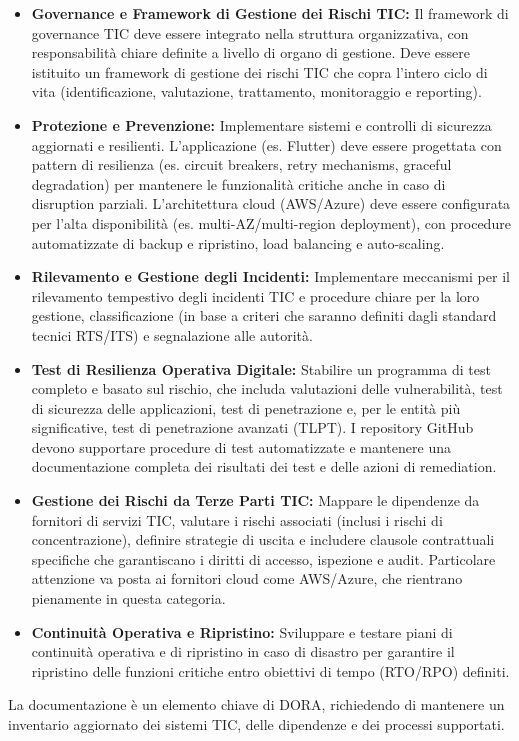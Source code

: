 \begin{itemize}
    \item \textbf{Governance e Framework di Gestione dei Rischi TIC:} Il framework di governance TIC deve essere integrato nella struttura organizzativa, con responsabilità chiare definite a livello di organo di gestione. Deve essere istituito un framework di gestione dei rischi TIC che copra l'intero ciclo di vita (identificazione, valutazione, trattamento, monitoraggio e reporting).
    \item \textbf{Protezione e Prevenzione:} Implementare sistemi e controlli di sicurezza aggiornati e resilienti. L'applicazione (es. Flutter) deve essere progettata con pattern di resilienza (es. circuit breakers, retry mechanisms, graceful degradation) per mantenere le funzionalità critiche anche in caso di disruption parziali. L'architettura cloud (AWS/Azure) deve essere configurata per l'alta disponibilità (es. multi-AZ/multi-region deployment), con procedure automatizzate di backup e ripristino, load balancing e auto-scaling.
    \item \textbf{Rilevamento e Gestione degli Incidenti:} Implementare meccanismi per il rilevamento tempestivo degli incidenti TIC e procedure chiare per la loro gestione, classificazione (in base a criteri che saranno definiti dagli standard tecnici RTS/ITS) e segnalazione alle autorità.
    \item \textbf{Test di Resilienza Operativa Digitale:} Stabilire un programma di test completo e basato sul rischio, che includa valutazioni delle vulnerabilità, test di sicurezza delle applicazioni, test di penetrazione e, per le entità più significative, test di penetrazione avanzati (TLPT). I repository GitHub devono supportare procedure di test automatizzate e mantenere una documentazione completa dei risultati dei test e delle azioni di remediation.
    \item \textbf{Gestione dei Rischi da Terze Parti TIC:} Mappare le dipendenze da fornitori di servizi TIC, valutare i rischi associati (inclusi i rischi di concentrazione), definire strategie di uscita e includere clausole contrattuali specifiche che garantiscano i diritti di accesso, ispezione e audit. Particolare attenzione va posta ai fornitori cloud come AWS/Azure, che rientrano pienamente in questa categoria.
    \item \textbf{Continuità Operativa e Ripristino:} Sviluppare e testare piani di continuità operativa e di ripristino in caso di disastro per garantire il ripristino delle funzioni critiche entro obiettivi di tempo (RTO/RPO) definiti.
\end{itemize}
La documentazione è un elemento chiave di DORA, richiedendo di mantenere un inventario aggiornato dei sistemi TIC, delle dipendenze e dei processi supportati.

